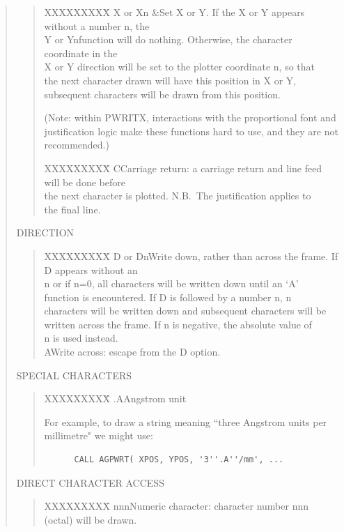 \documentclass[11pt]{article}
\renewcommand{\_}{{\tt\char'137}}     %
\begin{document}
\begin{quote}
\begin{quote}
\begin{tabbing}
XXXXXXXXX\=\kill
X or Xn \&\>Set X or Y.  If the X or Y appears without a number n, the\\
Y or Yn\>function will do nothing.  Otherwise, the character coordinate in the\\
\>X or Y direction will be set to the plotter coordinate n, so that\\
\>the next character drawn will have this position in X or Y,\\
\>subsequent characters will be drawn from this position.
\end{tabbing}
(Note: within PWRITX, interactions with the proportional font
and justification logic make these functions hard to use, and
they are not recommended.)
\begin{tabbing}
XXXXXXXXX\=\kill
C\>Carriage return: a carriage return and line feed will be done before\\
\>the next character is plotted. N.B.\ The justification applies to\\
\>the final line.
\end{tabbing}
\end{quote}

DIRECTION

\begin{quote}
\begin{tabbing}
XXXXXXXXX\=\kill
D or Dn\>Write down, rather than across the frame.  If D appears without an\\
\>n or if n=0, all characters will be written down until an `A'\\
\>function is encountered.  If D is followed by a number n, n\\
\>characters will be written down and subsequent characters will be\\
\>written across the frame.  If n is negative, the absolute value of\\
\>n is used instead.\\
A\>Write across: escape from the D option.
\end{tabbing}
\end{quote}

SPECIAL CHARACTERS

\begin{quote}
\begin{tabbing}
XXXXXXXXX\=\kill
.A\>Angstrom unit
\end{tabbing}

For example, to draw a string meaning ``three Angstrom units per
millimetre" we might use:

\begin{verbatim}
      CALL AGPWRT( XPOS, YPOS, '3''.A''/mm', ...
\end{verbatim}
\end{quote}

DIRECT CHARACTER ACCESS

\begin{quote}
\begin{tabbing}
XXXXXXXXX\=\kill
nnn\>Numeric character: character number nnn (octal) will be drawn.
\end{tabbing}
\end{quote}
\end{quote}
\end{document}
